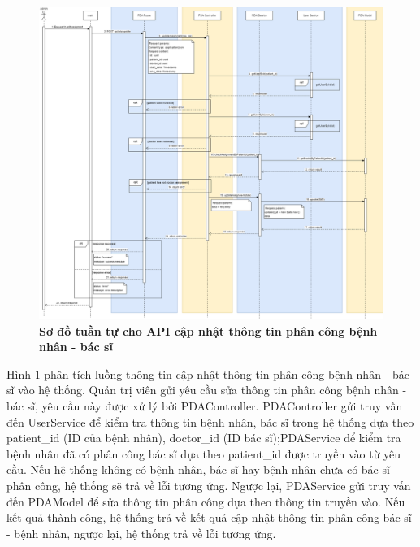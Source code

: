 \begin{figure}[H]
  \centering
  \includegraphics[scale=0.3]{Images/sequence_api/editAssignment.png}
  \caption[Sơ đồ tuần tự cho API cập nhật thông tin phân công bệnh nhân - bác sĩ]{\bfseries \fontsize{12pt}{0pt}
  \selectfont Sơ đồ tuần tự cho API cập nhật thông tin phân công bệnh nhân - bác sĩ }
  \label{api_editPDA} %
\end{figure}
Hình \ref{api_editPDA} phân tích luồng thông tin cập nhật thông tin phân công bệnh nhân - bác sĩ vào hệ thống. Quản trị viên gửi yêu cầu sửa thông tin phân công bệnh nhân - bác sĩ, 
yêu cầu này được xử lý bởi PDAController. PDAController gửi truy vấn đến UserService để kiểm tra thông tin bệnh nhân, bác sĩ trong hệ thống dựa theo patient\_id (ID của bệnh nhân), doctor\_id (ID bác sĩ);PDAService để kiểm
tra bệnh nhân đã có phân công bác sĩ dựa theo patient\_id được truyền vào từ yêu cầu. Nếu hệ thống không có bệnh nhân, bác sĩ hay bệnh nhân chưa có bác sĩ phân công, hệ thống sẽ trả về lỗi tương ứng. 
Ngược lại, PDAService gửi truy vấn đến PDAModel để sửa thông tin phân công dựa theo thông tin truyền vào. Nếu kết quả thành công, hệ thống trả về kết quả cập nhật thông tin phân công bác sĩ - bệnh nhân, ngược lại, hệ thống trả về lỗi tương ứng.

